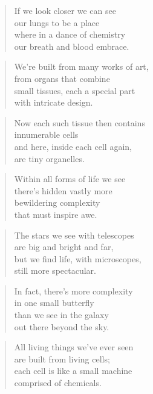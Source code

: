 \documentclass[10pt,a4paper]{article}
\begin{document}
\begin{multicols}{2}
\begin{verse}
If we look closer we can see\\
our lungs to be a place\\
where in a dance of chemistry\\
our breath and blood embrace.
\end{verse}

\begin{verse}
We’re built from many works of art,\\
from organs that combine\\
small tissues, each a special part\\
with intricate design.
\end{verse}

\begin{verse}
Now each such tissue then contains\\
innumerable cells\\
and here, inside each cell again,\\
are tiny organelles.
\end{verse}

\begin{verse}
Within all forms of life we see\\
there’s hidden vastly more\\
bewildering complexity\\
that must inspire awe.
\end{verse}

\begin{verse}
The stars we see with telescopes\\
are big and bright and far,\\
but we find life, with microscopes,\\
still more spectacular.
\end{verse}

\begin{verse}
In fact, there’s more complexity\\
in one small butterfly\\
than we see in the galaxy\\
out there beyond the sky.
\end{verse}

\begin{verse}
All living things we’ve ever seen\\
are built from living cells;\\
each cell is like a small machine\\
comprised of chemicals.
\end{verse}


\end{multicols}
\end{document}
